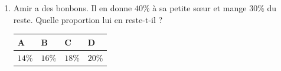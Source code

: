 \documentclass[oneside,12pt]{exam}          %
\begin{document}
\begin{enumerate}[label=\underline{Question \no\arabic*} :  , leftmargin=* , itemsep=5mm]
		

	\item Amir a des bonbons. Il en donne $40\%$ à sa petite sœur et mange $30\%$ du reste. Quelle proportion lui en reste-t-il ?
	
		\hspace{\linewidth-\textwidth}
		\renewcommand{\arraystretch}{1.5}
		\begin{tabular}{| P{0.22\textwidth} | P{0.22\textwidth} | P{0.22\textwidth} | P{0.22\textwidth} |} \hline
			A & B & C & D \\ \hline
			$14\%$ & $16\%$ & $18\%$ & $20\%$ \\ \hline
		\end{tabular}



\newpage
\end{enumerate}
\end{document}
